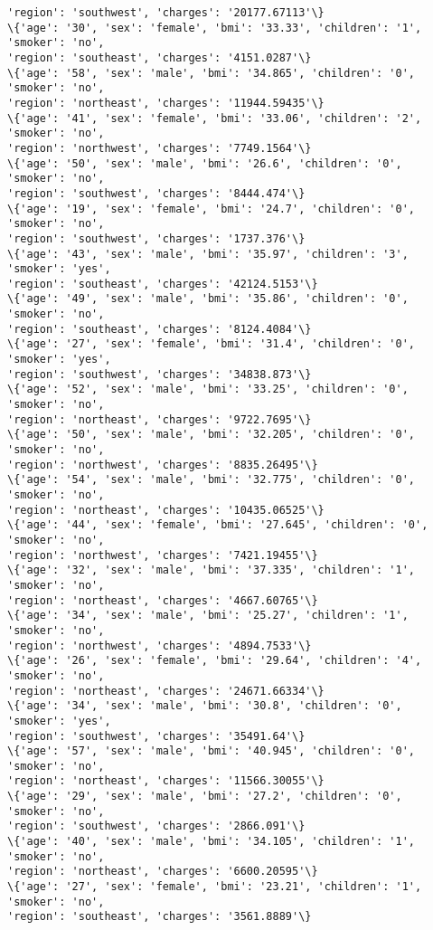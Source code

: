 \documentclass[11pt]{article}
\begin{document}
\begin{Verbatim}[commandchars=\\\{\}]
'region': 'southwest', 'charges': '20177.67113'\}
\{'age': '30', 'sex': 'female', 'bmi': '33.33', 'children': '1', 'smoker': 'no',
'region': 'southeast', 'charges': '4151.0287'\}
\{'age': '58', 'sex': 'male', 'bmi': '34.865', 'children': '0', 'smoker': 'no',
'region': 'northeast', 'charges': '11944.59435'\}
\{'age': '41', 'sex': 'female', 'bmi': '33.06', 'children': '2', 'smoker': 'no',
'region': 'northwest', 'charges': '7749.1564'\}
\{'age': '50', 'sex': 'male', 'bmi': '26.6', 'children': '0', 'smoker': 'no',
'region': 'southwest', 'charges': '8444.474'\}
\{'age': '19', 'sex': 'female', 'bmi': '24.7', 'children': '0', 'smoker': 'no',
'region': 'southwest', 'charges': '1737.376'\}
\{'age': '43', 'sex': 'male', 'bmi': '35.97', 'children': '3', 'smoker': 'yes',
'region': 'southeast', 'charges': '42124.5153'\}
\{'age': '49', 'sex': 'male', 'bmi': '35.86', 'children': '0', 'smoker': 'no',
'region': 'southeast', 'charges': '8124.4084'\}
\{'age': '27', 'sex': 'female', 'bmi': '31.4', 'children': '0', 'smoker': 'yes',
'region': 'southwest', 'charges': '34838.873'\}
\{'age': '52', 'sex': 'male', 'bmi': '33.25', 'children': '0', 'smoker': 'no',
'region': 'northeast', 'charges': '9722.7695'\}
\{'age': '50', 'sex': 'male', 'bmi': '32.205', 'children': '0', 'smoker': 'no',
'region': 'northwest', 'charges': '8835.26495'\}
\{'age': '54', 'sex': 'male', 'bmi': '32.775', 'children': '0', 'smoker': 'no',
'region': 'northeast', 'charges': '10435.06525'\}
\{'age': '44', 'sex': 'female', 'bmi': '27.645', 'children': '0', 'smoker': 'no',
'region': 'northwest', 'charges': '7421.19455'\}
\{'age': '32', 'sex': 'male', 'bmi': '37.335', 'children': '1', 'smoker': 'no',
'region': 'northeast', 'charges': '4667.60765'\}
\{'age': '34', 'sex': 'male', 'bmi': '25.27', 'children': '1', 'smoker': 'no',
'region': 'northwest', 'charges': '4894.7533'\}
\{'age': '26', 'sex': 'female', 'bmi': '29.64', 'children': '4', 'smoker': 'no',
'region': 'northeast', 'charges': '24671.66334'\}
\{'age': '34', 'sex': 'male', 'bmi': '30.8', 'children': '0', 'smoker': 'yes',
'region': 'southwest', 'charges': '35491.64'\}
\{'age': '57', 'sex': 'male', 'bmi': '40.945', 'children': '0', 'smoker': 'no',
'region': 'northeast', 'charges': '11566.30055'\}
\{'age': '29', 'sex': 'male', 'bmi': '27.2', 'children': '0', 'smoker': 'no',
'region': 'southwest', 'charges': '2866.091'\}
\{'age': '40', 'sex': 'male', 'bmi': '34.105', 'children': '1', 'smoker': 'no',
'region': 'northeast', 'charges': '6600.20595'\}
\{'age': '27', 'sex': 'female', 'bmi': '23.21', 'children': '1', 'smoker': 'no',
'region': 'southeast', 'charges': '3561.8889'\}

\end{Verbatim}
\end{document}
